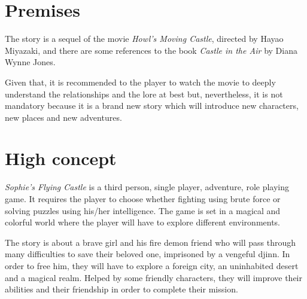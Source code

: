 \section{Premises}

The story is a sequel of the movie \textit{Howl’s Moving Castle}, directed by Hayao Miyazaki, and there are some references to the book \textit{Castle in the Air} by Diana Wynne Jones.

Given that, it is recommended to the player to watch the movie to deeply understand the relationships and the lore at best but, nevertheless, it is not mandatory because it is a brand new story which will introduce new characters, new places and new adventures.

{\let\clearpage\relax\section{High concept}}

\textit{Sophie's Flying Castle} is a third person, single player, adventure, role playing game. It requires the player to choose whether fighting using brute force or solving puzzles using his/her intelligence. The game is set in a magical and colorful world where the player will have to explore different environments. 

The story is about a brave girl and his fire demon friend who will pass through many difficulties to save their beloved one, imprisoned by a vengeful djinn. In order to free him, they will have to explore a foreign city, an uninhabited desert and a magical realm. Helped by some friendly characters, they will improve their abilities and their friendship in order to complete their mission.

\newpage
